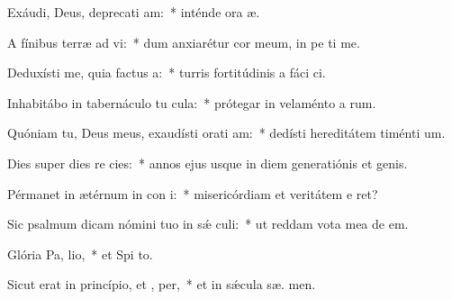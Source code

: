 \item Exáudi, Deus, deprecati am:~* inténde ora æ.
\item A fínibus terræ ad  vi:~* dum anxiarétur cor meum, in pe ti me.
\item Deduxísti me, quia factus   a:~* turris fortitúdinis a fáci ci.
\item Inhabitábo in tabernáculo tu  cula:~* prótegar in velaménto a rum.
\item Quóniam tu, Deus meus, exaudísti orati am:~* dedísti hereditátem timénti  um.
\item Dies super dies re cies:~* annos ejus usque in diem generatiónis et genis.
\item Pérmanet in ætérnum in con i:~* misericórdiam et veritátem e  ret?
\item Sic psalmum dicam nómini tuo in sǽ culi:~* ut reddam vota mea de   em.
\item Glória Pa,  lio,~* et Spi to.
\item Sicut erat in princípio, et ,  per,~* et in sǽcula sæ. men.
